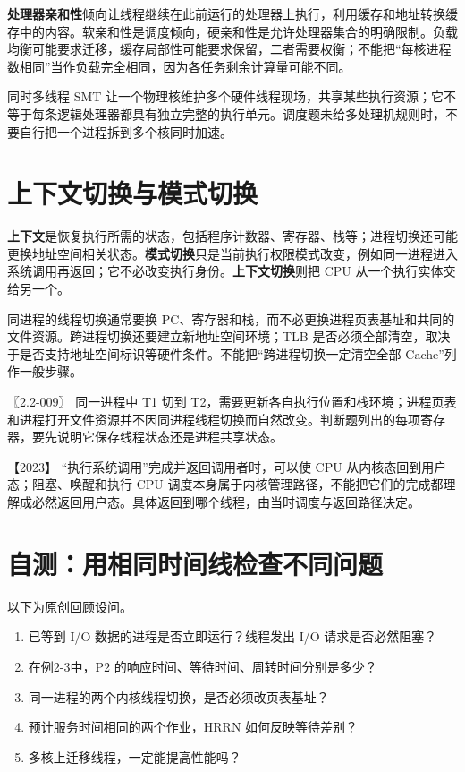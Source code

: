 \textbf{处理器亲和性}倾向让线程继续在此前运行的处理器上执行，利用缓存和地址转换缓存中的内容。软亲和性是调度倾向，硬亲和性是允许处理器集合的明确限制。负载均衡可能要求迁移，缓存局部性可能要求保留，二者需要权衡；不能把``每核进程数相同''当作负载完全相同，因为各任务剩余计算量可能不同。

同时多线程 SMT 让一个物理核维护多个硬件线程现场，共享某些执行资源；它不等于每条逻辑处理器都具有独立完整的执行单元。调度题未给多处理机规则时，不要自行把一个进程拆到多个核同时加速。

\section{上下文切换与模式切换}\label{os-2-10}

\textbf{上下文}是恢复执行所需的状态，包括程序计数器、寄存器、栈等；进程切换还可能更换地址空间相关状态。\textbf{模式切换}只是当前执行权限模式改变，例如同一进程进入系统调用再返回；它不必改变执行身份。\textbf{上下文切换}则把 CPU 从一个执行实体交给另一个。

同进程的线程切换通常要换 PC、寄存器和栈，而不必更换进程页表基址和共同的文件资源。跨进程切换还要建立新地址空间环境；TLB 是否必须全部清空，取决于是否支持地址空间标识等硬件条件。不能把``跨进程切换一定清空全部 Cache''列作一般步骤。

\noindent{}〖2.2-009〗 同一进程中 T1 切到 T2，需要更新各自执行位置和栈环境；进程页表和进程打开文件资源并不因同进程线程切换而自然改变。判断题列出的每项寄存器，要先说明它保存线程状态还是进程共享状态。

\noindent{}【2023】 ``执行系统调用''完成并返回调用者时，可以使 CPU 从内核态回到用户态；阻塞、唤醒和执行 CPU 调度本身属于内核管理路径，不能把它们的完成都理解成必然返回用户态。具体返回到哪个线程，由当时调度与返回路径决定。

\section{自测：用相同时间线检查不同问题}\label{os-2-review}

以下为原创回顾设问。

\begin{enumerate}
\def\labelenumi{\arabic{enumi}.}
\tightlist
\item
  已等到 I/O 数据的进程是否立即运行？线程发出 I/O 请求是否必然阻塞？
\item
  在例2-3中，P2 的响应时间、等待时间、周转时间分别是多少？
\item
  同一进程的两个内核线程切换，是否必须改页表基址？
\item
  预计服务时间相同的两个作业，HRRN 如何反映等待差别？
\item
  多核上迁移线程，一定能提高性能吗？
\end{enumerate}

